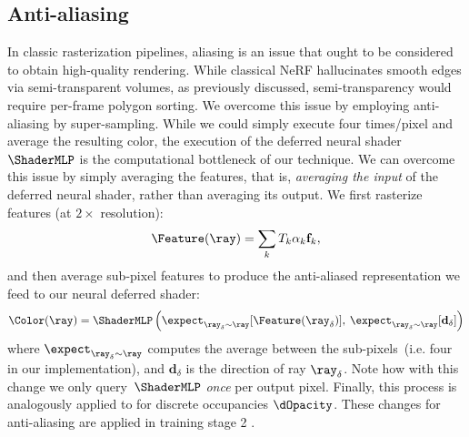 \subsection{Anti-aliasing}
\label{sec:antialiasing}
In classic rasterization pipelines, aliasing is an issue that ought to be considered to obtain high-quality rendering.
While classical NeRF hallucinates smooth edges via semi-transparent volumes, as previously discussed, semi-transparency would require per-frame polygon sorting. 
We overcome this issue by employing anti-aliasing by super-sampling.
While we could simply execute  four times/pixel and average the resulting color, the execution of the deferred neural shader $\ShaderMLP$ is the computational bottleneck of our technique.
We can overcome this issue by simply averaging the features, that is, \textit{averaging the input} of the deferred neural shader, rather than averaging its output.
We first rasterize features (at $2\times$ resolution):
\begin{align}
\Feature(\ray) = \sum_k T_k \alpha_k \mathbf{f}_k,
\end{align}
and then average sub-pixel features to produce the anti-aliased representation we feed to our neural deferred shader:
\begin{align}
\Color(\ray) = \ShaderMLP
\left(
\expect_{\ray_\delta \sim \ray}[\Feature(\ray_\delta)], \:
\expect_{\ray_\delta \sim \ray}[\mathbf{d}_\delta]
\right)
\label{eq:antialiased_shader}
\end{align}
where $\expect_{\ray_\delta {\sim} \ray}$ computes the average between the sub-pixels~(i.e. four in our implementation), and $\mathbf{d}_\delta$ is the direction of ray $\ray_\delta$.
Note how with this change we only query~$\ShaderMLP$ \textit{once} per output pixel. Finally, this process is analogously applied to  for discrete occupancies $\dOpacity$.
These changes for anti-aliasing are applied in training stage 2 .


